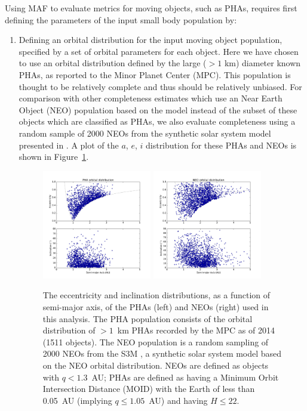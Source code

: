 Using MAF to evaluate metrics for moving objects, such as PHAs, requires first defining the parameters of the input small body population by:

\begin{enumerate}
\item{Defining an orbital distribution for the input moving object population, specified by a set of orbital parameters for each object. Here we have chosen to use an orbital distribution defined by the large ($>1$ km) diameter known PHAs, as reported to the Minor Planet Center (MPC). This population is thought to be relatively complete and thus should be relatively unbiased. For comparison with other completeness estimates which use an Near Earth Object (NEO) population based on the \cite{Bottke2002} model instead of the subset of these objects which are classified as PHAs, we also evaluate completeness using a random sample of 2000 NEOs from the synthetic solar system model presented in \cite{Grav2011}.  A plot of the $a$, $e$, $i$ distribution for these PHAs and NEOs is shown in Figure~\ref{fig:PHA_orbits}.  }
\begin{figure}
\centering
\includegraphics[width=0.45\textwidth]{figures/pha20141031_orbits} 
\includegraphics[width=0.45\textwidth]{figures/neos_2k_orbits}
\caption{The eccentricity and inclination distributions, as a function of semi-major axis, of the PHAs (left) and NEOs (right) used in this analysis. The PHA population consists of the orbital distribution of $>1$~km PHAs recorded by the MPC as of 2014 (1511 objects). The NEO population is a random sampling of 2000 NEOs from the S3M \citep{Grav2011}, a synthetic solar system model based on the \cite{Bottke2002} NEO orbital distribution. NEOs are defined as objects with $q<1.3$~AU; PHAs are defined as having a Minimum Orbit Intersection Distance (MOID) with the Earth of less than 0.05~AU (implying $q\le1.05$~AU) and having $H\le22$.  \label{fig:PHA_orbits}}
\end{figure}


\end{enumerate}
